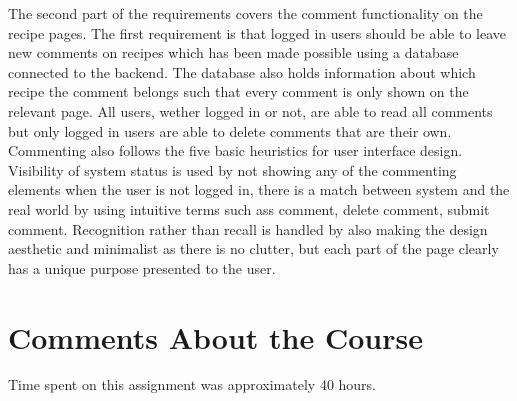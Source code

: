 \documentclass[a4paper]{scrartcl}
\begin{document}
The second part of the requirements covers the comment functionality on the recipe pages. The first requirement is that logged in users should be able to leave new comments on recipes which has been made possible using a database connected to the backend. The database also holds information about which recipe the comment belongs such that every comment is only shown on the relevant page. All users, wether logged in or not, are able to read all comments but only logged in users are able to delete comments that are their own. Commenting also follows the five basic heuristics for user interface design. Visibility of system status is used by not showing any of the commenting elements when the user is not logged in, there is a match between system and the real world by using intuitive terms such ass comment, delete comment, submit comment. Recognition rather than recall is handled by also making the design aesthetic and minimalist as there is no clutter, but each part of the page clearly has a unique purpose presented to the user.
\printbibliography

\section{Comments About the Course}
Time spent on this assignment was approximately 40 hours. 
\end{document}
